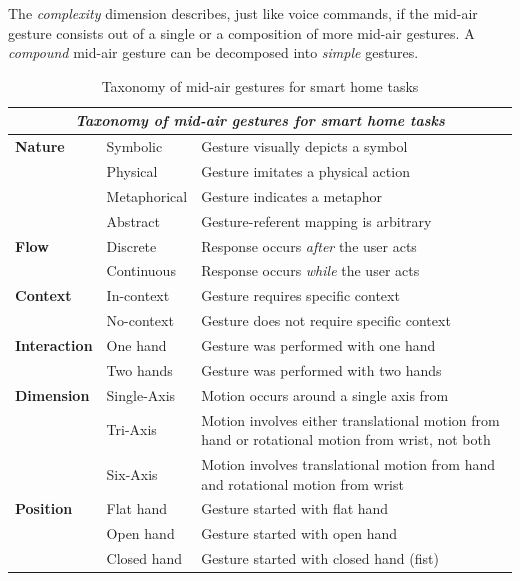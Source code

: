 \documentclass[sigchi]{acmart}
\begin{document}
	The \textit{complexity} dimension describes, just like voice commands, if the mid-air gesture consists out of a single or a composition of more mid-air gestures. A \textit{compound} mid-air gesture can be decomposed into \textit{simple} gestures.	
	\begin{table}[t]
		\begin{center}
			\caption{Taxonomy of mid-air gestures for smart home tasks}
			\label{tab:taxGestures}
			\begin{footnotesize}
				\begin{tabular}{p{} p{} p{}} \toprule
					\multicolumn{3}{c}{\textit{Taxonomy of mid-air gestures for smart home tasks}} \\ \midrule
					\textbf{Nature}		& Symbolic			& Gesture visually depicts a symbol \\
										& Physical			& Gesture imitates a physical action \\ 
										& Metaphorical 		& Gesture indicates a metaphor \\ 
										& Abstract			& Gesture-referent mapping is arbitrary \\ \midrule
					\textbf{Flow}		& Discrete			& Response occurs \textit{after} the user acts \\ 
										& Continuous 		& Response occurs \textit{while} the user acts  \\ 
					\textbf{Context}	& In-context		& Gesture requires specific context \\
										& No-context		& Gesture does not require specific context \\ \midrule
					\textbf{Interaction}& One hand			& Gesture was performed with one hand \\
										& Two hands			& Gesture was performed with two hands \\ \midrule
					\textbf{Dimension}	& Single-Axis		& Motion occurs around a single axis from \\
										& Tri-Axis			& Motion involves either translational motion from hand or rotational motion from wrist, not both \\
										& Six-Axis			& Motion involves translational motion from hand and rotational motion from wrist \\ \midrule
					\textbf{Position}	& Flat hand			& Gesture started with flat hand \\
										& Open hand			& Gesture started with open hand \\
										& Closed hand		& Gesture started with closed hand (fist) \\

\end{tabular}
\end{footnotesize}
\end{center}
\end{table}
\end{document}
